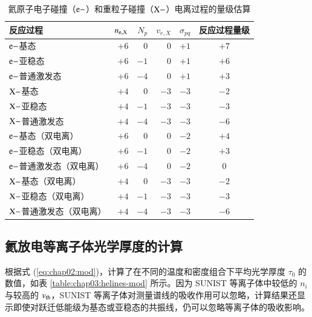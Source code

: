 \begin{table}%
\caption{氦原子电子碰撞（${\rm e-}$）和重粒子碰撞（${\rm X-}$）电离过程的量级估算}
\label{table:chap03:ion-process-gusuan}
\begin{center}
\begin{tabular}{lrrrrc}\toprule[1.5pt]
反应过程 & $n_{\rm e,X}$ & $N_{p}$ & $v_{e,X}$ & $\sigma_{pq}$ & 反应过程量级\\
\midrule[1pt]
${\rm e-}$基态       & $+6$ & $0$  & $0$  & $+1$ & $+7$ \\
${\rm e-}$亚稳态     & $+6$ & $-1$ & $0$  & $+1$ & $+6$ \\
${\rm e-}$普通激发态 & $+6$ & $-4$ & $0$  & $+1$ & $+3$ \\
${\rm X-}$基态       & $+4$ & $0$  & $-3$ & $-3$ & $-2$ \\
${\rm X-}$亚稳态     & $+4$ & $-1$ & $-3$ & $-3$ & $-3$ \\
${\rm X-}$普通激发态 & $+4$ & $-4$ & $-3$ & $-3$ & $-6$ \\
${\rm e-}$基态（双电离）       & $+6$ & $0$  & $0$  & $-2$  & $+4$ \\
${\rm e-}$亚稳态（双电离）     & $+6$ & $-1$ & $0$  & $-2$  & $+3$ \\
${\rm e-}$普通激发态（双电离） & $+6$ & $-4$ & $0$  & $-2$  & \hspace{0.8em}$0$ \\
${\rm X-}$基态（双电离）       & $+4$ & $0$  & $-3$ & $-3$ & $-2$ \\
${\rm X-}$亚稳态（双电离）     & $+4$ & $-1$ & $-3$ & $-3$ & $-3$ \\
${\rm X-}$普通激发态（双电离） & $+4$ & $-4$ & $-3$ & $-3$ & $-6$ \\
\bottomrule[1.5pt]
\end{tabular}
\end{center}
\end{table}

\subsection{氦放电等离子体光学厚度的计算}

根据式 (\ref{eq:chap02:mod})，计算了在不同的温度和密度组合下平均光学厚度 $\tau_0$ 的数值，如表 \ref{table:chap03:helines-mod} 所示。因为 SUNIST 等离子体中较低的 $n_i$ 与较高的 $v_{\rm th}$，SUNIST 等离子体对测量谱线的吸收作用可以忽略，计算结果还显示即使对跃迁低能级为基态或亚稳态的共振线，仍可以忽略等离子体的吸收影响。

